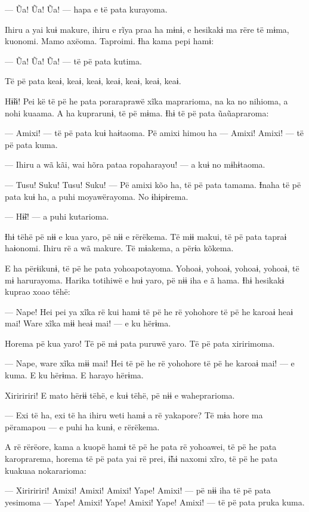 --- Ũa! Ũa! Ũa! --- hapa e të pata kurayoma. 

Ihiru a yai kuɨ makure, ihiru e rĩya praa ha mɨnɨ, e hesikakɨ ma rëre të
mɨma, kuonomi. Mamo axëoma. Taproimi. Ɨha kama pepi hamɨ: 

--- Ũa! Ũa! Ũa! --- të pë pata kutima. 

Të pë pata keaɨ, keaɨ, keaɨ, keaɨ, keaɨ, keaɨ, keaɨ. 

Hɨ̃ɨɨ! Pei kë të pë he pata poraraprawë xĩka maprarioma, na ka no
nihioma, a nohi kuaama. A ha kuprarunɨ, të pë mɨma. Ɨhɨ të pë pata
ũaũapraroma: 

--- Amixi! --- të pë pata kuɨ haɨtaoma. Pë amixi himou ha --- Amixi!
Amixi! --- të pë pata kuma.

--- Ihiru a wã kãi, wai hõra pataa ropaharayou! --- a kuɨ no mɨhɨtaoma.

--- Tusu! Suku! Tusu! Suku! --- Pë amixi kõo ha, të pë pata tamama.
Ɨnaha të pë pata kuɨ ha, a puhi moyawërayoma. No ɨhɨpɨrema. 

--- Hɨ̃ɨ! --- a puhi kutarioma. 

Ɨhɨ tëhë pë nɨɨ e kua yaro, pë nɨɨ e rërëkema. Të mɨɨ makui, të pë pata
tapraɨ haɨonomi. Ihiru rë a wã makure. Të mɨakema, a përɨa kõkema. 

E ha përɨikunɨ, të pë he pata yohoapotayoma. Yohoaɨ, yohoaɨ, yohoaɨ,
yohoaɨ, të mɨ harurayoma. Harika totihiwë e huɨ yaro, pë nɨɨ iha e ã
hama. Ɨhɨ hesikakɨ kuprao xoao tëhë:

--- Nape! Hei pei ya xĩka rë kui hamɨ të pë he rë yohohore të pë he
karoaɨ heaɨ mai! Ware xĩka mɨɨ heaɨ mai! --- e ku hërɨma. 

Horema pë kua yaro! Të pë mɨ pata puruwë yaro. Të pë pata xiririmoma. 

--- Nape, ware xĩka mɨɨ mai! Hei të pë he rë yohohore të pë he karoaɨ
mai! --- e kuma. E ku hërɨma. E harayo hërɨma. 

Xiriririri! E mato hërɨɨ tëhë, e kuɨ tëhë, pë nɨɨ e waheprarioma. 

--- Exi të ha, exi të ha ihiru weti hamɨ a rë yakapore? Të mɨa hore ma
përamapou --- e puhi ha kunɨ, e rërëkema. 

A rë rërëore, kama a kuopë hamɨ të pë he pata rë yohoawei, të pë he pata
karoprarema, horema të pë pata yai rë prei, ɨ̃hɨ naxomi xĩro, të pë he
pata kuakuaa nokararioma:

--- Xiriririri! Amixi! Amixi! Amixi! Yape! Amixi! --- pë nɨɨ iha të pë
pata yesimoma --- Yape! Amixi! Yape! Amixi! Yape! Amixi! --- të pë pata
pruka kuma. 

